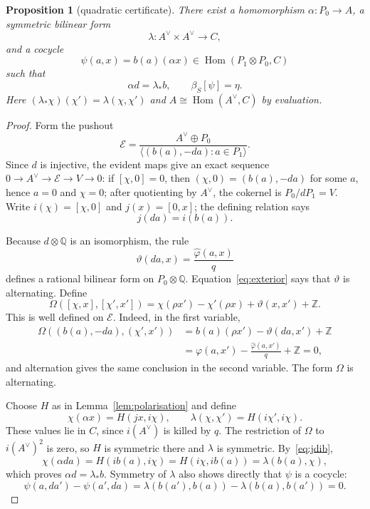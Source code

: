 \documentclass[11pt]{amsart}
\newtheorem{proposition}[theorem]{Proposition}
\theoremstyle{remark}
\newcommand{\Z}{\mathbb Z}
\newcommand{\Q}{\mathbb Q}
\newcommand{\Hom}{\operatorname{Hom}}
\begin{document}
\begin{proposition}[quadratic certificate]\label{prop:certificate}
There exist a homomorphism $\alpha:P_0\to A$, a symmetric bilinear form
\[
 \lambda:A^\vee\times A^\vee\longrightarrow C,
\]
and a cocycle
\[
 \psi(a,x)=b(a)(\alpha x)
     \in\Hom(P_1\otimes P_0,C)
\]
such that
\begin{equation}\label{eq:certificate}
              \alpha d=\lambda_*b,
 \qquad
              \beta_S[\psi]=\eta.
\end{equation}
Here $(\lambda_*\chi)(\chi')=\lambda(\chi,\chi')$ and
$A\cong\Hom(A^\vee,C)$ by evaluation.
\end{proposition}

\begin{proof}
Form the pushout
\begin{equation}\label{eq:E}
 \mathcal E=
 \frac{A^\vee\oplus P_0}
      {\langle(b(a),-da):a\in P_1\rangle}.
\end{equation}
Since $d$ is injective, the evident maps give an exact sequence
$0\to A^\vee\to\mathcal E\to V\to0$: if $[\chi,0]=0$, then
$(\chi,0)=(b(a),-da)$ for some $a$, hence $a=0$ and $\chi=0$; after
quotienting by $A^\vee$, the cokernel is $P_0/dP_1=V$.  Write
$i(\chi)=[\chi,0]$ and $j(x)=[0,x]$; the defining relation says
\begin{equation}\label{eq:jdib}
                         j(da)=i(b(a)).
\end{equation}

Because $d\otimes\Q$ is an isomorphism, the rule
\begin{equation}\label{eq:vartheta}
 \vartheta(da,x)=\frac{\widehat\varphi(a,x)}q
\end{equation}
defines a rational bilinear form on $P_0\otimes\Q$.
Equation~\eqref{eq:exterior} says that $\vartheta$ is alternating.
Define
\begin{equation}\label{eq:Omega}
 \Omega([\chi,x],[\chi',x'])
 =\chi(\rho x')-\chi'(\rho x)+\vartheta(x,x')+\Z.
\end{equation}
This is well defined on $\mathcal E$.  Indeed, in the first variable,
\begin{align*}
 \Omega((b(a),-da),(\chi',x'))
 &=b(a)(\rho x')-\vartheta(da,x')+\Z\\
 &=\varphi(a,x')-\frac{\widehat\varphi(a,x')}q+\Z=0,
\end{align*}
and alternation gives the same conclusion in the second variable.
The form $\Omega$ is alternating.

Choose $H$ as in Lemma~\ref{lem:polarisation} and define
\begin{equation}\label{eq:alpha-lambda}
 \chi(\alpha x)=H(jx,i\chi),
 \qquad
 \lambda(\chi,\chi')=H(i\chi',i\chi).
\end{equation}
These values lie in $C$, since $i(A^\vee)$ is killed by $q$.  The
restriction of $\Omega$ to $i(A^\vee)^2$ is zero, so $H$ is symmetric
there and $\lambda$ is symmetric.  By~\eqref{eq:jdib},
\[
 \chi(\alpha da)=H(i b(a),i\chi)
 =H(i\chi,i b(a))=\lambda(b(a),\chi),
\]
which proves $\alpha d=\lambda_*b$.  Symmetry of $\lambda$ also shows
directly that $\psi$ is a cocycle:
\[
 \psi(a,da')-\psi(a',da)
 =\lambda(b(a'),b(a))-\lambda(b(a),b(a'))=0.
\]


\end{proof}
\end{document}
